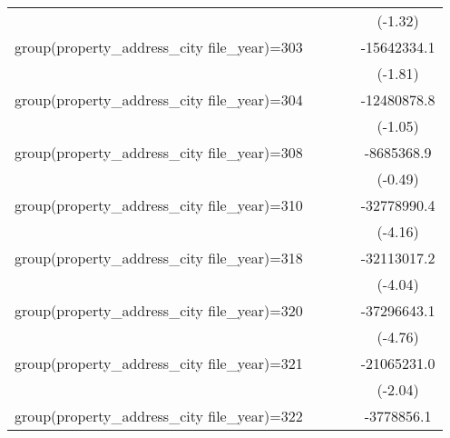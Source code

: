 {\begin{tabular}{l*{4}{c}}
                    &                     &                     &                     &     (-1.32)         \\
\addlinespace
group(property\_address\_city file\_year)=303&                     &                     &                     & -15642334.1         \\
                    &                     &                     &                     &     (-1.81)         \\
\addlinespace
group(property\_address\_city file\_year)=304&                     &                     &                     & -12480878.8         \\
                    &                     &                     &                     &     (-1.05)         \\
\addlinespace
group(property\_address\_city file\_year)=308&                     &                     &                     &  -8685368.9         \\
                    &                     &                     &                     &     (-0.49)         \\
\addlinespace
group(property\_address\_city file\_year)=310&                     &                     &                     & -32778990.4\sym{***}\\
                    &                     &                     &                     &     (-4.16)         \\
\addlinespace
group(property\_address\_city file\_year)=318&                     &                     &                     & -32113017.2\sym{***}\\
                    &                     &                     &                     &     (-4.04)         \\
\addlinespace
group(property\_address\_city file\_year)=320&                     &                     &                     & -37296643.1\sym{***}\\
                    &                     &                     &                     &     (-4.76)         \\
\addlinespace
group(property\_address\_city file\_year)=321&                     &                     &                     & -21065231.0\sym{*}  \\
                    &                     &                     &                     &     (-2.04)         \\
\addlinespace
group(property\_address\_city file\_year)=322&                     &                     &                     &  -3778856.1         \\

\end{tabular}}
